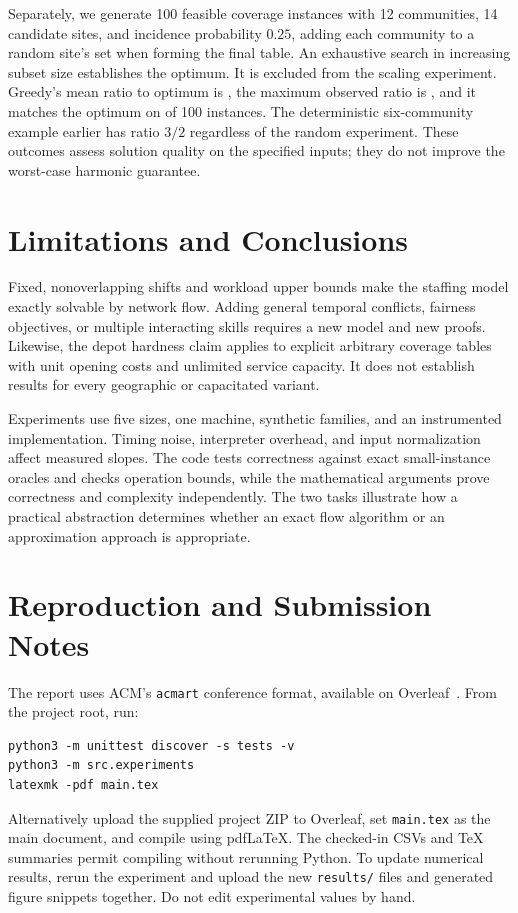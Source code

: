 \documentclass[sigconf,nonacm]{acmart}
\begin{document}
Separately, we generate 100 feasible coverage instances with 12 communities,
14 candidate sites, and incidence probability $0.25$, adding each community
to a random site's set when forming the final table. An exhaustive search
in increasing subset size establishes the optimum. It is excluded from the
scaling experiment. Greedy's mean ratio to optimum is
\QualityMeanRatio{}, the maximum observed ratio is \QualityMaxRatio{}, and
it matches the optimum on \QualityOptimalCount{} of 100 instances.
The deterministic six-community example earlier has ratio $3/2$ regardless
of the random experiment. These outcomes assess solution quality on the
specified inputs; they do not improve the worst-case harmonic guarantee.

\section{Limitations and Conclusions}
Fixed, nonoverlapping shifts and workload upper bounds make the staffing
model exactly solvable by network flow. Adding general temporal conflicts,
fairness objectives, or multiple interacting skills requires a new model and
new proofs. Likewise, the depot hardness claim applies to explicit arbitrary
coverage tables with unit opening costs and unlimited service capacity.
It does not establish results for every geographic or capacitated variant.

Experiments use five sizes, one machine, synthetic families, and an
instrumented implementation. Timing noise, interpreter overhead, and
input normalization affect measured slopes. The code tests correctness
against exact small-instance oracles and checks operation bounds, while
the mathematical arguments prove correctness and complexity independently.
The two tasks illustrate how a practical abstraction determines whether an
exact flow algorithm or an approximation approach is appropriate.




\clearpage
\onecolumn
\appendix
\lstset{basicstyle=\ttfamily\footnotesize}
\section{Reproduction and Submission Notes}
The report uses ACM's \texttt{acmart} conference format, available on
Overleaf~\cite{template}. From the project root, run:
\begin{Verbatim}[fontsize=\small,breaklines=true]
python3 -m unittest discover -s tests -v
python3 -m src.experiments
latexmk -pdf main.tex
\end{Verbatim}
Alternatively upload the supplied project ZIP to Overleaf, set
\texttt{main.tex} as the main document, and compile using pdfLaTeX.
The checked-in CSVs and TeX summaries permit compiling without rerunning
Python. To update numerical results, rerun the experiment and upload the new
\texttt{results/} files and generated figure snippets together. Do not edit
experimental values by hand.
\end{document}
